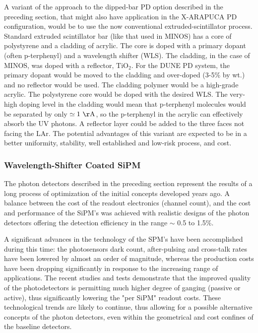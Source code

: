  A variant of the approach to the dipped-bar PD option described in the preceding section, 
 that might also have application in the X-ARAPUCA PD configuration,
 would be to use the now conventional extruded-scintillator process.  Standard extruded scintillator bar (like that
used in MINOS) has a core of polystyrene and a cladding of acrylic.  The core is doped with
a primary dopant (often p-terphenyl) and a wavelength shifter (WLS).  The cladding, in the case of
MINOS, was doped with a reflector, TiO$_2$.  For the DUNE PD system, the primary dopant would
be moved to the cladding and over-doped (3-5\% by wt.) and no reflector would be used.  The cladding polymer would be a
high-grade acrylic.  The polystyrene core would be doped with the desired WLS.   The very-high
doping level in the cladding would mean that p-terphenyl molecules would be separated by only 
$\simeq 1~\mathrm{\AA}$, so the p-terphenyl in the acrylic can effectively absorb the UV
photons.  A reflector layer could be added to the three faces not facing the LAr. 
The potential advantages of this variant are expected to be in a 
better uniformity, stability, well established and low-risk process, and cost.
 
\subsubsection{Wavelength-Shifter Coated SiPM} 
The photon detectors described in the preceding section represent the results of a long process of optimization of the initial concepts developed years ago. A balance between the cost of the readout electronics (channel count), and the cost and performance of the SiPM's was achieved with realistic designs of the photon detectors offering the detection efficiency in the range $\sim$ 0.5 to 1.5\%.
 
A significant advances in the technology of the SPM's have been accomplished during this time: the photosensors dark count, after-pulsing and cross-talk rates have been lowered by almost an order of magnitude, whereas the production costs have been dropping significantly in response to the increasing range of applications.  The recent studies and tests demonstrate that the improved quality of the photodetectors is permitting much higher degree of ganging (passive or active), thus significantly lowering the "per SiPM" readout costs.
These technological trends are likely to continue, thus allowing for a possible alternative concepts of the photon detectors, even within the geometrical and cost confines of the baseline detectors.

